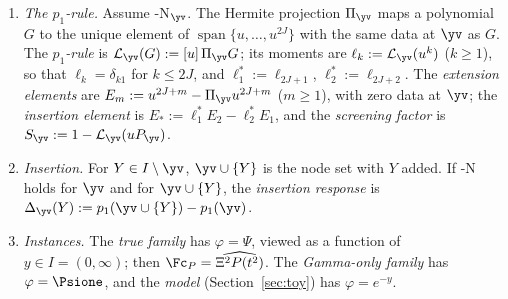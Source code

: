 \begin{definition}
\begin{enumerate}[label=(\roman*),leftmargin=2em]
($j\le J$). Condition \hyp{N}$_{\yv}$ states that the $2J\times2J$ matrix $[\varphi_k(y_j);\varphi_k'(y_j)]$,
$j\le J$, $1\le k\le2J$, is non-singular; then the solution $P_{\yv}=1+\sum_{k=1}^{2J}p_k(\yv)u^k$ is unique,
and $\Fc_{\yv}:=\Fc_{P_{\yv}}$.
\item \emph{The $p_1$-rule.} Assume \hyp{N}$_{\yv}$. The Hermite projection $\Pi_{\yv}$ maps a polynomial $G$ to the
unique element of $\operatorname{span}\{u,\dots,u^{2J}\}$ with the same data at $\yv$ as $G$. The
\emph{$p_1$-rule} is $\mathcal L_{\yv}(G):=[u]\,\Pi_{\yv}G$; its moments are $\ell_k:=\mathcal L_{\yv}(u^k)$
($k\ge1$), so that $\ell_k=\delta_{k1}$ for $k\le2J$, and $\ell_1^*:=\ell_{2J+1}$, $\ell_2^*:=\ell_{2J+2}$. The
\emph{extension elements} are $E_m:=u^{2J+m}-\Pi_{\yv}u^{2J+m}$ ($m\ge1$), with zero data at $\yv$; the
\emph{insertion element} is $E_*:=\ell_1^*E_2-\ell_2^*E_1$, and the \emph{screening factor} is
$S_{\yv}:=1-\mathcal L_{\yv}(uP_{\yv})$.
\item \emph{Insertion.} For $Y\in I\setminus\yv$, $\yv\cup\{Y\}$ is the node set with $Y$ added. If
\hyp{N} holds for $\yv$ and for $\yv\cup\{Y\}$, the \emph{insertion response} is
$\Delta_{\yv}(Y):=p_1(\yv\cup\{Y\})-p_1(\yv)$.
\item \emph{Instances.} The \emph{true family} has $\varphi=\Psi$, viewed as a function of $y\in I=(0,\infty)$;
then $\Fc_P=\widehat{\Xi^2P(t^2)}$. The \emph{Gamma-only family} has $\varphi=\Psione$, and the \emph{model}
(Section~\ref{sec:toy}) has $\varphi=e^{-y}$.
\end{enumerate}
\end{definition}

